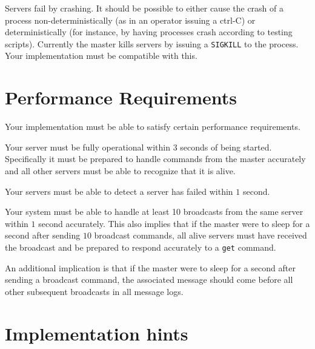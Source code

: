 \documentclass[11pt]{article}
\begin{document}
	Servers fail by crashing. It should be possible to either cause the crash of a process non-deterministically (as in an operator issuing a ctrl-C) or deterministically (for instance, by having processes crash according to testing scripts). Currently the master kills servers by issuing a \texttt{SIGKILL} to the process. Your implementation must be compatible with this.
	
	\section{Performance Requirements}
	Your implementation must be able to satisfy certain performance requirements.
	
	\begin{compactitem}
		\item Your server must be fully operational within $3$ seconds of being started. Specifically it must be prepared to handle commands from the master accurately and all other servers must be able to recognize that it is alive.
		\item Your servers must be able to detect a server has failed within $1$ second.
		\item Your system must be able to handle at least 10 broadcasts from the same server within $1$ second accurately. This also implies that if the master were to sleep for a second after sending $10$ broadcast commands, all alive servers must have received the broadcast and be prepared to respond accurately to a \texttt{get} command.
		\item An additional implication is that if the master were to sleep for a second after sending a broadcast command, the associated message should come before all other subsequent broadcasts in all message logs.
	\end{compactitem}
	
	\section{Implementation hints}
	
\end{document}
